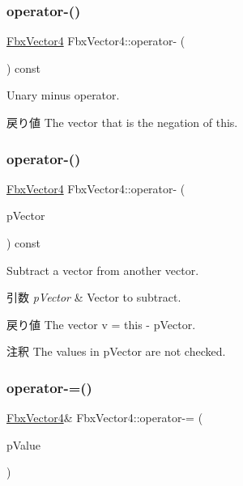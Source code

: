 \subsubsection{\texorpdfstring{operator-\/()}{operator-()}\hspace{0.1cm}{\footnotesize\ttfamily [2/3]}}
{\footnotesize\ttfamily \hyperlink{class_fbx_vector4}{Fbx\+Vector4} Fbx\+Vector4\+::operator-\/ (\begin{DoxyParamCaption}{ }\end{DoxyParamCaption}) const}

Unary minus operator. \begin{DoxyReturn}{戻り値}
The vector that is the negation of {\ttfamily this}. 
\end{DoxyReturn}
\mbox{\label{class_fbx_vector4_a5c49b63dc74031c9c977fb94c9bd5fd8}} 
\subsubsection{\texorpdfstring{operator-\/()}{operator-()}\hspace{0.1cm}{\footnotesize\ttfamily [3/3]}}
{\footnotesize\ttfamily \hyperlink{class_fbx_vector4}{Fbx\+Vector4} Fbx\+Vector4\+::operator-\/ (\begin{DoxyParamCaption}\item[{const \hyperlink{class_fbx_vector4}{Fbx\+Vector4} \&}]{p\+Vector }\end{DoxyParamCaption}) const}

Subtract a vector from another vector. 
\begin{DoxyParams}{引数}
{\em p\+Vector} & Vector to subtract. \\
\hline
\end{DoxyParams}
\begin{DoxyReturn}{戻り値}
The vector v\textquotesingle{} = this -\/ p\+Vector. 
\end{DoxyReturn}
\begin{DoxyRemark}{注釈}
The values in p\+Vector are not checked. 
\end{DoxyRemark}
\mbox{\label{class_fbx_vector4_a536bc542d0cb4cf6d4c86b1cf34d62a5}} 
\subsubsection{\texorpdfstring{operator-\/=()}{operator-=()}\hspace{0.1cm}{\footnotesize\ttfamily [1/2]}}
{\footnotesize\ttfamily \hyperlink{class_fbx_vector4}{Fbx\+Vector4}\& Fbx\+Vector4\+::operator-\/= (\begin{DoxyParamCaption}\item[{double}]{p\+Value }\end{DoxyParamCaption})}

